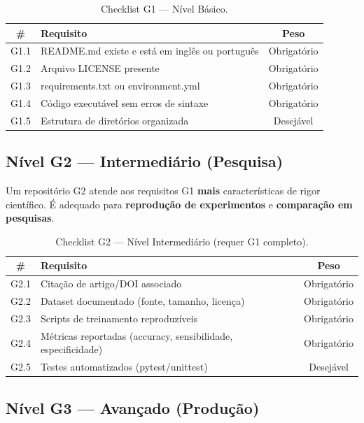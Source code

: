 \begin{table}[H]
  \centering
  \caption{Checklist G1 — Nível Básico.}
  \label{tab:g1-checklist}
  \begin{tabularx}{\textwidth}{cXc}
    \toprule
    \textbf{\#} & \textbf{Requisito} & \textbf{Peso} \\
    \midrule
    G1.1 & README.md existe e está em inglês ou português & Obrigatório \\
    G1.2 & Arquivo LICENSE presente & Obrigatório \\
    G1.3 & requirements.txt ou environment.yml & Obrigatório \\
    G1.4 & Código executável sem erros de sintaxe & Obrigatório \\
    G1.5 & Estrutura de diretórios organizada & Desejável \\
    \bottomrule
  \end{tabularx}
\end{table}

\subsection{Nível G2 — Intermediário (Pesquisa)}

Um repositório G2 atende aos requisitos G1 \textbf{mais} características
de rigor científico. É adequado para \textbf{reprodução de experimentos}
e \textbf{comparação em pesquisas}.

\begin{table}[H]
  \centering
  \caption{Checklist G2 — Nível Intermediário (requer G1 completo).}
  \label{tab:g2-checklist}
  \begin{tabularx}{\textwidth}{cXc}
    \toprule
    \textbf{\#} & \textbf{Requisito} & \textbf{Peso} \\
    \midrule
    G2.1 & Citação de artigo/DOI associado & Obrigatório \\
    G2.2 & Dataset documentado (fonte, tamanho, licença) & Obrigatório \\
    G2.3 & Scripts de treinamento reproduzíveis & Obrigatório \\
    G2.4 & Métricas reportadas (accuracy, sensibilidade, especificidade) & Obrigatório \\
    G2.5 & Testes automatizados (pytest/unittest) & Desejável \\
    \bottomrule
  \end{tabularx}
\end{table}

\subsection{Nível G3 — Avançado (Produção)}

